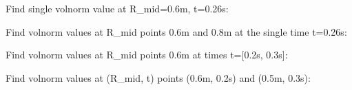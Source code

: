 \documentclass[letterpaper,10pt,english]{sphinxmanual}
\begin{document}
\begin{fulllineitems}
\begin{fulllineitems}
Find single volnorm value at R\_mid=0.6m, t=0.26s:

\begin{sphinxVerbatim}[commandchars=\\\{\}]
   
\end{sphinxVerbatim}

Find volnorm values at R\_mid points 0.6m and 0.8m at the single time
t=0.26s:

\begin{sphinxVerbatim}[commandchars=\\\{\}]
  \PYG{p}{[} \PYG{p}{]} 
\end{sphinxVerbatim}

Find volnorm values at R\_mid points 0.6m at times t={[}0.2s, 0.3s{]}:

\begin{sphinxVerbatim}[commandchars=\\\{\}]
   \PYG{p}{[} \PYG{p}{]}
\end{sphinxVerbatim}

Find volnorm values at (R\_mid, t) points (0.6m, 0.2s) and (0.5m, 0.3s):

\begin{sphinxVerbatim}[commandchars=\\\{\}]
  \PYG{p}{[} \PYG{p}{]} \PYG{p}{[} \PYG{p}{]} 
\end{sphinxVerbatim}

\end{fulllineitems}



\end{fulllineitems}
\end{document}
